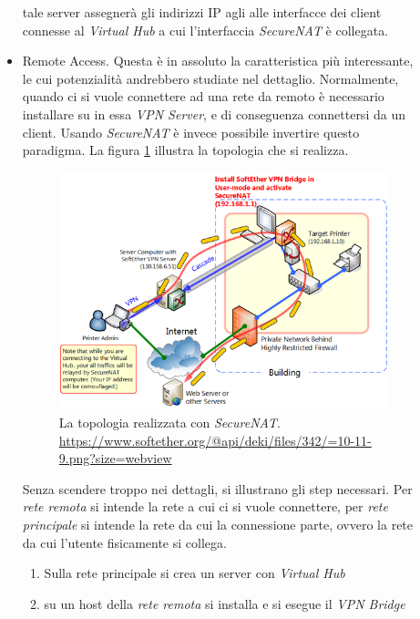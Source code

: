 \begin{description}
\begin{itemize}
    tale server assegnerà gli indirizzi IP agli alle interfacce dei client connesse al \textit{Virtual Hub} a cui
    l'interfaccia \textit{SecureNAT} è collegata.
    \item Remote Access. Questa è in assoluto la caratteristica più interessante, le cui potenzialità andrebbero studiate
    nel dettaglio. Normalmente, quando ci si vuole connettere ad una rete da remoto è
    necessario installare su in essa \textit{VPN Server}, e di conseguenza connettersi da un client. Usando \textit{SecureNAT}
    è invece possibile invertire questo paradigma. La figura \ref{fig:securenat} illustra la topologia che si realizza.\\
    \begin{figure}
      \includegraphics[scale=0.55]{img/softether_securenat}
      \caption[La topologia realizzata con \textit{SecureNAT}]{
        La topologia realizzata con \textit{SecureNAT}.
        \url{https://www.softether.org/@api/deki/files/342/=10-11-9.png?size=webview}}
        \label{fig:securenat}
    \end{figure}
    Senza scendere troppo nei dettagli, si illustrano gli step necessari. Per \textit{rete remota} si intende la rete a cui
    ci si vuole connettere, per \textit{rete principale} si intende la rete da cui la connessione parte, ovvero
    la rete da cui l'utente fisicamente si collega.
    \begin{enumerate}
      \item Sulla rete principale si crea un server con \textit{Virtual Hub}
      \item su un host della \textit{rete remota} si installa e si esegue il \textit{VPN Bridge}

\end{enumerate}
\end{itemize}
\end{description}
